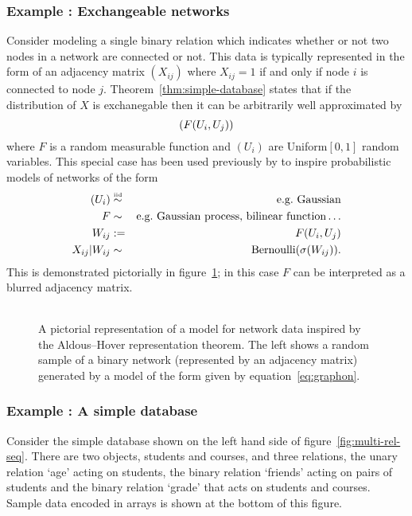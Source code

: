 \subsubsection{Example : Exchangeable networks}

Consider modeling a single binary relation which indicates whether or not two nodes in a network are connected or not.
This data is typically represented in the form of an adjacency matrix $(X_{ij})$ where $X_{ij} = 1$ if and only if node $i$ is connected to node $j$.
Theorem~\ref{thm:simple-database} states that if the distribution of $X$ is exchanegable then it can be arbitrarily well approximated by
\begin{equation}
(F(U_i, U_j))
\end{equation}
where $F$ is a random measurable function and $(U_i)$ are \iid Uniform$[0,1]$ random variables.
This special case has been used previously by \cite{Hoff2007a,Roy2009,Lloyd2012} to inspire probabilistic models of networks of the form
\begin{eqnarray}
(U_i) & \overset{\mbox{\tiny iid}}{\sim} & \textrm{e.g.\ Gaussian} \\
F & \sim & \textrm{e.g.\ Gaussian process, bilinear function}\ldots \\
W_{ij} & := & F(U_i, U_j) \\
X_{ij} | W_{ij} & \sim & \textrm{Bernoulli}(\sigma(W_{ij}))\label{eq:graphon}.
\end{eqnarray}
This is demonstrated pictorially in figure~\ref{fig:graphon}; in this case $F$ can be interpreted as a blurred adjacency matrix.

\begin{figure}[ht]
\centering
\begin{tabular}{c}

\end{tabular}
\caption{
A pictorial representation of a model for network data inspired by the Aldous--Hover representation theorem.
The left shows a random sample of a binary network (represented by an adjacency matrix) generated by a model of the form given by equation~\eqref{eq:graphon}.
}
\label{fig:graphon}
\end{figure}

\subsubsection{Example : A simple database}

Consider the simple database shown on the left hand side of figure~\ref{fig:multi-rel-seq}.
There are two objects, students and courses, and three relations, the unary relation `age' acting on students, the binary relation `friends' acting on pairs of students and the binary relation `grade' that acts on students and courses.
Sample data encoded in arrays is shown at the bottom of this figure.

